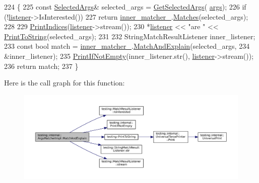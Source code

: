 \begin{DoxyCode}
224                                                                     \{
225     \textcolor{keyword}{const} \hyperlink{classtesting_1_1internal_1_1ArgsMatcherImpl_ab061679f6251e56ccbedaf0c316d00ff}{SelectedArgs}& selected\_args = \hyperlink{classtesting_1_1internal_1_1ArgsMatcherImpl_a168a7d6a82bd20fd6b1c777ab64c34a5}{GetSelectedArgs}(
      \hyperlink{namespacegenerate__debs_a75f9143e38df82d83b2e8a6f99cae02c}{args});
226     \textcolor{keywordflow}{if} (!\hyperlink{namespaceinteractive__marker_a0e579ab555212bb5e2c9f8a675b7618a}{listener}->IsInterested())
227       \textcolor{keywordflow}{return} \hyperlink{classtesting_1_1internal_1_1ArgsMatcherImpl_a719ba7e85d3381661021d699c9978ed0}{inner\_matcher\_}.\hyperlink{classtesting_1_1internal_1_1MatcherBase_a3b479673ff40cac1a7d548e91d789cb2}{Matches}(selected\_args);
228 
229     \hyperlink{classtesting_1_1internal_1_1ArgsMatcherImpl_a2ea95d7970a1874c9616e42009ae53b0}{PrintIndices}(\hyperlink{namespaceinteractive__marker_a0e579ab555212bb5e2c9f8a675b7618a}{listener}->stream());
230     *\hyperlink{namespaceinteractive__marker_a0e579ab555212bb5e2c9f8a675b7618a}{listener} << \textcolor{stringliteral}{"are "} << \hyperlink{namespacetesting_aa5717bb1144edd1d262d310ba70c82ed}{PrintToString}(selected\_args);
231 
232     StringMatchResultListener inner\_listener;
233     \textcolor{keyword}{const} \textcolor{keywordtype}{bool} match = \hyperlink{classtesting_1_1internal_1_1ArgsMatcherImpl_a719ba7e85d3381661021d699c9978ed0}{inner\_matcher\_}.\hyperlink{classtesting_1_1internal_1_1MatcherBase_a08429a6d7e7d330de4a4eb4e272105a7}{MatchAndExplain}(selected\_args,
234                                                       &inner\_listener);
235     \hyperlink{namespacetesting_1_1internal_afa4cd5d7933878d6d820b32c87bb2767}{PrintIfNotEmpty}(inner\_listener.str(), \hyperlink{namespaceinteractive__marker_a0e579ab555212bb5e2c9f8a675b7618a}{listener}->stream());
236     \textcolor{keywordflow}{return} match;
237   \}
\end{DoxyCode}
Here is the call graph for this function\+:
\nopagebreak
\begin{figure}[H]
\begin{center}
\leavevmode
\includegraphics[width=350pt]{classtesting_1_1internal_1_1ArgsMatcherImpl_a60383b3073a61f9d82cbf31fe19e6bfa_cgraph}
\end{center}
\end{figure}
